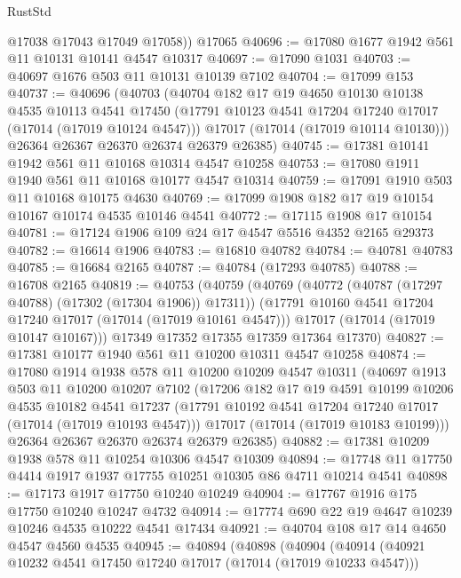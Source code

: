 \begin{lexlean}{RustStd}
\begin{coremodule}
        @17038
        @17043
        @17049
        @17058))
    @17065
@40696 := @17080 @1677 @1942 @561 @11 @10131 @10141 @4547 @10317
@40697 := @17090 @1031
@40703 := @40697 @1676 @503 @11 @10131 @10139 @7102
@40704 := @17099 @153
@40737 := @40696
    (@40703
      (@40704
        @182
        @17
        @19
        @4650
        @10130
        @10138
        @4535
        @10113
        @4541
        @17450
        (@17791 @10123 @4541 @17204 @17240 @17017 (@17014 (@17019 @10124 @4547)))
        @17017
        (@17014 (@17019 @10114 @10130)))
      @26364
      @26367
      @26370
      @26374
      @26379
      @26385)
@40745 := @17381 @10141 @1942 @561 @11 @10168 @10314 @4547 @10258
@40753 := @17080 @1911 @1940 @561 @11 @10168 @10177 @4547 @10314
@40759 := @17091 @1910 @503 @11 @10168 @10175 @4630
@40769 := @17099 @1908 @182 @17 @19 @10154 @10167 @10174 @4535 @10146 @4541
@40772 := @17115 @1908 @17 @10154
@40781 := @17124 @1906 @109 @24 @17 @4547 @5516 @4352 @2165 @29373
@40782 := @16614 @1906
@40783 := @16810 @40782
@40784 := @40781 @40783
@40785 := @16684 @2165
@40787 := @40784 (@17293 @40785)
@40788 := @16708 @2165
@40819 := @40753
    (@40759
      (@40769
        (@40772 (@40787 (@17297 @40788) (@17302 (@17304 @1906)) @17311))
        (@17791 @10160 @4541 @17204 @17240 @17017 (@17014 (@17019 @10161 @4547)))
        @17017
        (@17014 (@17019 @10147 @10167)))
      @17349
      @17352
      @17355
      @17359
      @17364
      @17370)
@40827 := @17381 @10177 @1940 @561 @11 @10200 @10311 @4547 @10258
@40874 := @17080
    @1914
    @1938
    @578
    @11
    @10200
    @10209
    @4547
    @10311
    (@40697
      @1913
      @503
      @11
      @10200
      @10207
      @7102
      (@17206
        @182
        @17
        @19
        @4591
        @10199
        @10206
        @4535
        @10182
        @4541
        @17237
        (@17791 @10192 @4541 @17204 @17240 @17017 (@17014 (@17019 @10193 @4547)))
        @17017
        (@17014 (@17019 @10183 @10199)))
      @26364
      @26367
      @26370
      @26374
      @26379
      @26385)
@40882 := @17381 @10209 @1938 @578 @11 @10254 @10306 @4547 @10309
@40894 := @17748 @11 @17750 @4414 @1917 @1937 @17755 @10251 @10305 @86 @4711 @10214 @4541
@40898 := @17173 @1917 @17750 @10240 @10249
@40904 := @17767 @1916 @175 @17750 @10240 @10247 @4732
@40914 := @17774 @690 @22 @19 @4647 @10239 @10246 @4535 @10222 @4541 @17434
@40921 := @40704 @108 @17 @14 @4650 @4547 @4560 @4535
@40945 := @40894
    (@40898
      (@40904
        (@40914
          (@40921 @10232 @4541 @17450 @17240 @17017 (@17014 (@17019 @10233 @4547)))

\end{coremodule}
\end{lexlean}
